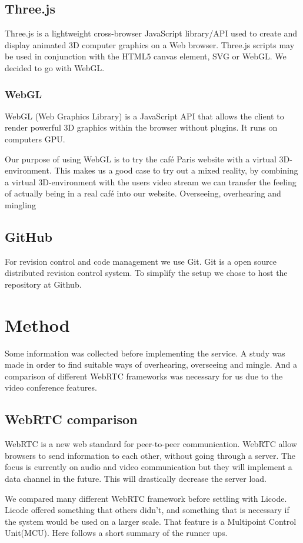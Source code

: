 \documentclass[12pt, titlepage]{article}
\begin{document}
\subsection{Three.js}
Three.js\cite{34} is a lightweight cross-browser JavaScript library/API used to create and display animated 3D computer graphics on a Web browser. Three.js scripts may be used in conjunction with the HTML5 canvas element, SVG or WebGL. We decided to go with WebGL.
\subsubsection{WebGL}
WebGL (Web Graphics Library) is a JavaScript API that allows the client to render powerful 3D graphics within the browser without plugins. It runs on computers GPU.

Our purpose of using WebGL is to try the café Paris website with a virtual 3D-environment. This makes us a good case to try out a mixed reality, by combining a virtual 3D-environment with the users video stream we can transfer the feeling of actually being in a real café into our website. Overseeing, overhearing and mingling
\subsection{GitHub}
For revision control and code management we use Git. Git is a open source distributed revision control system. To simplify the setup we chose to host the repository at Github\cite{35}.

\section{Method}
Some information was collected before implementing the service. A study was made in order to find suitable ways of overhearing, overseeing and mingle. And a comparison of different WebRTC frameworks was necessary for us due to the video conference features.
\subsection{WebRTC comparison}
WebRTC is a new web standard for peer-to-peer communication. WebRTC allow browsers to send information to each other, without going through a server. The focus is currently on audio and video communication but they will implement a data channel in the future. This will drastically decrease the server load.

We compared many different WebRTC framework before settling with Licode. Licode offered something that others didn't, and something that is necessary if the system would be used on a larger scale. That feature is a Multipoint Control Unit(MCU). Here follows a short summary of the runner ups.
\end{document}
